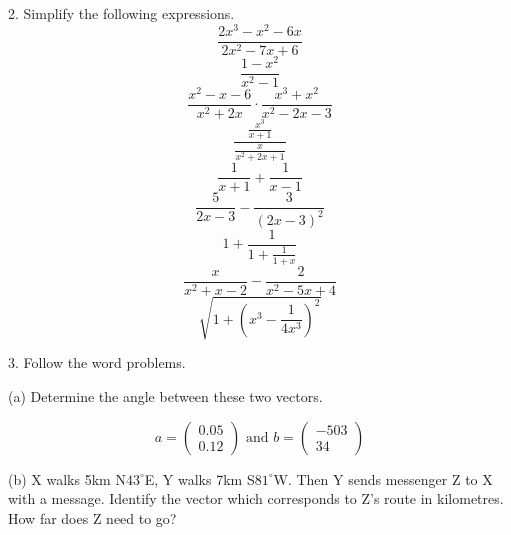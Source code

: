 \documentclass[11pt]{article}
\begin{document}
2. Simplify the following expressions.
\begin{equation}
  \label{eq:uxohjeib}
\frac{2x^{3}-x^{2}-6x}{2x^{2}-7x+6}
\end{equation}
\begin{equation}
  \label{eq:eicohrae}
\frac{1-x^{2}}{x^{2}-1}
\end{equation}
\begin{equation}
  \label{eq:epuufeca}
\frac{x^{2}-x-6}{x^{2}+2x}\cdot\frac{x^{3}+x^{2}}{x^{2}-2x-3}
\end{equation}
\begin{equation}
  \label{eq:weungodu}
\frac{\frac{x^{3}}{x+1}}{\frac{x}{x^{2}+2x+1}}
\end{equation}
\begin{equation}
  \label{eq:oraighah}
\frac{1}{x+1}+\frac{1}{x-1}
\end{equation}
\begin{equation}
  \label{eq:saenonge}
\frac{5}{2x-3}-\frac{3}{(2x-3)^{2}}
\end{equation}
\begin{equation}
  \label{eq:eeghoghi}
1+\frac{1}{1+\frac{1}{1+x}}
\end{equation}
\begin{equation}
  \label{eq:eesicaet}
\frac{x}{x^{2}+x-2}-\frac{2}{x^{2}-5x+4}
\end{equation}
\begin{equation}
  \label{eq:fixahfee}
\sqrt{1+\left(x^{3}-\frac{1}{4x^{3}}\right)^{2}}
\end{equation}

3. Follow the word problems.

(a) Determine the angle between these two vectors.

\begin{equation}
  \label{eq:acaewoow}
a=\left(
  \begin{array}{c}
    0.05 \\
    0.12
  \end{array}\right)\mbox{ and }
b=\left(
  \begin{array}{c}
    -503 \\
    34
  \end{array}\right)
\end{equation}

(b) X walks 5km N$43^{\circ}$E, Y walks 7km S$81^{\circ}$W. Then Y
sends messenger Z to X with a message. Identify the vector which
corresponds to Z's route in kilometres. How far does Z need to go?
\end{document}
